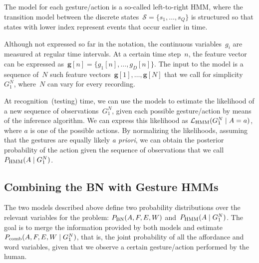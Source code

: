 The model for each gesture/action is a so-called left-to-right \ac{HMM}, where the transition model between the discrete states~$\mathcal{S} = \{s_1, \dots, s_Q\}$ is structured so that states with lower index represent events that occur earlier in time.

Although not expressed so far in the notation, the continuous variables~$g_i$ are measured at regular time intervals.
At a certain time step~$n$, the feature vector can be expressed as~$\mathbf{g}[n] = \{g_1[n], \dots, g_D[n]\}$.
The input to the model is a sequence of~$N$ such feature vectors~$\mathbf{g}[1], \dots, \mathbf{g}[N]$ that we call for simplicity~$G_1^N$, where~$N$ can vary for every recording.

At recognition~(testing) time, we can use the models to estimate the likelihood of a new sequence of observations~$G_1^N$, given each possible gesture/action by means of the \FB{} inference algorithm.
We can express this likelihood as $\mathcal{L}_\text{HMM}(G_1^N \mid A=a)$, where $a$ is one of the possible actions.
By normalizing the likelihoods, assuming that the gestures are equally likely \emph{a priori}, we can obtain the posterior probability of the action given the sequence of observations that we call~$P_{\text{HMM}}(A \mid G_1^N)$.


\subsection{Combining the \acs{BN} with Gesture \acsp{HMM}}
\label{sec:combination}

The two models described above define two probability distributions over the relevant variables for the problem:
$P_{\text{BN}}(A, F, E, W)$ and~$P_{\text{HMM}}(A \mid G_1^N)$.
The goal is to merge the information provided by both models and estimate~$P_\text{comb}(A, F, E, W \mid G_1^N)$, that is, the joint probability of all the affordance and word variables, given that we observe a certain gesture/action performed by the human.

